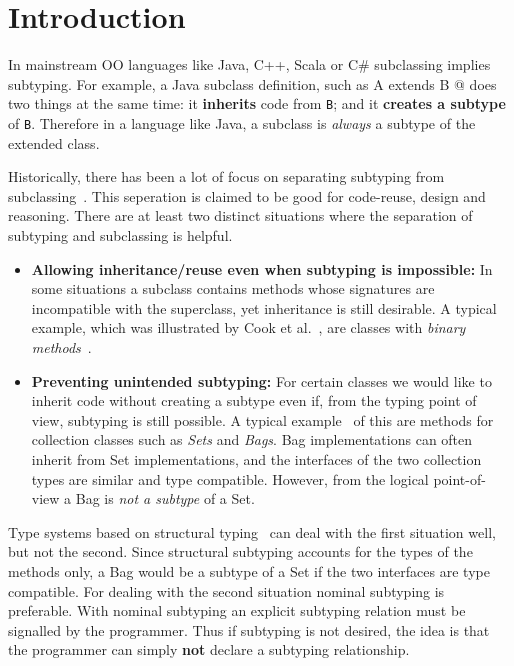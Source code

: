 \section{Introduction}\label{sec:intro}
In mainstream OO languages like Java, C++, Scala or C\# subclassing 
implies subtyping. For example, a Java subclass definition, such as 
\Q@class A extends B {}@
\noindent does two things at the same time:
it {\bf inherits} code from \lstinline{B}; and it {\bf creates
a subtype} of \lstinline{B}. Therefore in a language like Java, 
a subclass is \emph{always} a subtype of the extended class.

Historically, there has been a lot of focus on
separating subtyping from subclassing~\cite{cook}.  This seperation is claimed to be
good for code-reuse, design and reasoning. There are at
least two distinct situations where the separation of subtyping and 
subclassing is helpful.

\begin{itemize}

\item {\bf Allowing inheritance/reuse even when subtyping is impossible:} 
In some situations a subclass contains methods whose signatures 
are incompatible with the superclass, yet inheritance is still
desirable. A typical example, which was illustrated by Cook et al.~\cite{cook}, are 
classes with \emph{binary methods}~\cite{bruce96binary}.

\item {\bf Preventing unintended subtyping:} For certain classes we
  would like to inherit code without creating a subtype even if, from
  the typing point of view, subtyping is still possible. A typical
  example~\cite{LaLonde:1991:SSS:110673.110679} of this are methods for collection classes such as \emph{Sets} and
  \emph{Bags}. Bag implementations can often inherit 
  from Set implementations, and the interfaces of the two collection types are
  similar and type compatible. 
  However, from the logical point-of-view a Bag is \emph{not a
    subtype} of a Set. 

\end{itemize}

Type systems based on structural typing~\cite{cook} can deal with the first
situation well, but not the second. Since structural subtyping
accounts for the types of the methods only, a Bag would be a subtype
of a Set if the two interfaces are type compatible. For dealing with
the second situation nominal subtyping is preferable. With nominal
subtyping an explicit subtyping relation must be signalled by the
programmer. Thus if subtyping is not desired, the idea is that the
programmer can simply {\bf not} declare a subtyping relationship.

